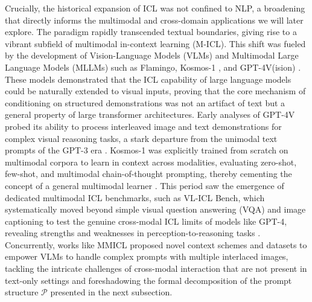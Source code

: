 \documentclass[11pt]{article}
\begin{document}
Crucially, the historical expansion of ICL was not confined to NLP, a broadening that directly informs the multimodal and cross-domain applications we will later explore. The paradigm rapidly transcended textual boundaries, giving rise to a vibrant subfield of multimodal in-context learning (M-ICL). This shift was fueled by the development of Vision-Language Models (VLMs) and Multimodal Large Language Models (MLLMs) such as Flamingo, Kosmos-1 \cite{ref11}, and GPT-4V(ision) \cite{ref12}. These models demonstrated that the ICL capability of large language models could be naturally extended to visual inputs, proving that the core mechanism of conditioning on structured demonstrations was not an artifact of text but a general property of large transformer architectures. Early analyses of GPT-4V probed its ability to process interleaved image and text demonstrations for complex visual reasoning tasks, a stark departure from the unimodal text prompts of the GPT-3 era \cite{ref12}. Kosmos-1 was explicitly trained from scratch on multimodal corpora to learn in context across modalities, evaluating zero-shot, few-shot, and multimodal chain-of-thought prompting, thereby cementing the concept of a general multimodal learner \cite{ref11}. This period saw the emergence of dedicated multimodal ICL benchmarks, such as VL-ICL Bench, which systematically moved beyond simple visual question answering (VQA) and image captioning to test the genuine cross-modal ICL limits of models like GPT-4, revealing strengths and weaknesses in perception-to-reasoning tasks \cite{ref13}. Concurrently, works like MMICL \cite{ref14} proposed novel context schemes and datasets to empower VLMs to handle complex prompts with multiple interlaced images, tackling the intricate challenges of cross-modal interaction that are not present in text-only settings and foreshadowing the formal decomposition of the prompt structure \(\mathcal{P}\) presented in the next subsection.
\end{document}
